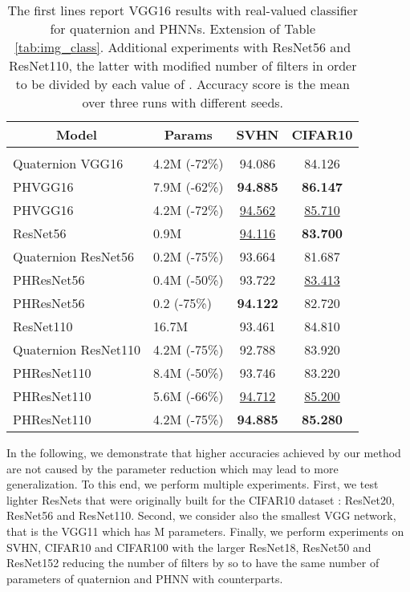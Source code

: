 \documentclass[lettersize,journal]{IEEEtran}
\begin{document}
\begin{table}[]
\caption{The first lines report VGG16 results with real-valued classifier for quaternion and PHNNs. Extension of Table \ref{tab:img_class}. Additional experiments with ResNet56 and ResNet110, the latter with modified number of filters in order to be divided by each value of . Accuracy score is the mean over three runs with different seeds.}
\label{tab:img_class_app3}
\begin{center}
\begin{tabular}{llcc}
\multicolumn{1}{c}{\bf Model} &\multicolumn{1}{c}{\bf Params} &\multicolumn{1}{c}{\bf SVHN} &\multicolumn{1}{c}{\bf CIFAR10} \\
\hline \\
Quaternion VGG16 & 4.2M (-72\%) & 94.086 & 84.126 \\
PHVGG16   & 7.9M (-62\%) & \textbf{94.885} & \textbf{86.147} \\
PHVGG16   & 4.2M (-72\%) & \underline{94.562} & \underline{85.710} \\ \hline
ResNet56             & 0.9M         & \underline{94.116} & \textbf{83.700}  \\
Quaternion ResNet56  & 0.2M (-75\%) & 93.664 & 81.687  \\
PHResNet56    & 0.4M (-50\%) & 93.722 & \underline{83.413}  \\
PHResNet56    & 0.2 (-75\%)  & \textbf{94.122} & 82.720  \\
\hline
ResNet110            & 16.7M        & 93.461 & 84.810  \\
Quaternion ResNet110 & 4.2M (-75\%) & 92.788 & 83.920  \\
PHResNet110   & 8.4M (-50\%) & 93.746 & 83.220  \\
PHResNet110   & 5.6M (-66\%) & \underline{94.712} & \underline{85.200}  \\
PHResNet110   & 4.2M (-75\%) & \textbf{94.885} & \textbf{85.280}  \\
\end{tabular}
\end{center}
\end{table}

In the following, we demonstrate that higher accuracies achieved by our method are not caused by the parameter reduction which may lead to more generalization. To this end, we perform multiple experiments. First, we test lighter ResNets that were originally built for the CIFAR10 dataset \cite{Resnet2016}: ResNet20, ResNet56 and ResNet110. Second, we consider also the smallest VGG network, that is the VGG11 which has M parameters. Finally, we perform experiments on SVHN, CIFAR10 and CIFAR100 with the larger ResNet18, ResNet50 and ResNet152 reducing the number of filters by  so to have the same number of parameters of quaternion and PHNN with  counterparts.
\end{document}
